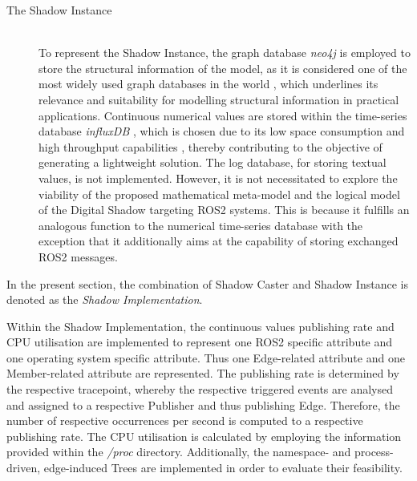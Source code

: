 \begin{description}
        \item[The Shadow Instance] \hfill \\
            To represent the Shadow Instance, the graph database \emph{neo4j} \cite{website:neo4j} is employed to store the structural information of the model, as it is considered one of the most widely used graph databases in the world \cite[p.~377]{neo4jWidelyUsed}, which underlines its relevance and suitability for modelling structural information in practical applications.\newline
            Continuous numerical values are stored within the time-series database \emph{influxDB} \cite{website:influxdb}, which is chosen due to its low space consumption and high throughput capabilities \cite[p.~13]{influxdbPerformance}, thereby contributing to the objective of generating a lightweight solution.\newline
            The log database, for storing textual values, is not implemented. However, it is not necessitated to explore the viability of the proposed mathematical meta-model and the logical model of the Digital Shadow targeting ROS2 systems. This is because it fulfills an analogous function to the numerical time-series database with the exception that it additionally aims at the capability of storing exchanged ROS2 messages.\newline
        \end{description}

        In the present section, the combination of Shadow Caster and Shadow Instance is denoted as the \emph{Shadow Implementation}.

        Within the Shadow Implementation, the continuous values \glqq{}publishing rate\grqq{} and \glqq{}CPU utilisation\grqq{} are implemented to represent one ROS2 specific attribute and one operating system specific attribute. Thus one Edge-related attribute and one Member-related attribute are represented. The \glqq{}publishing rate\grqq{} is determined by the respective tracepoint, whereby the respective triggered events are analysed and assigned to a respective Publisher and thus publishing Edge. Therefore, the number of respective occurrences per second is computed to a respective publishing rate. The CPU utilisation is calculated by employing the information provided within the \emph{/proc} directory.\newline
        Additionally, the namespace- and process-driven, edge-induced Trees are implemented in order to evaluate their feasibility.

